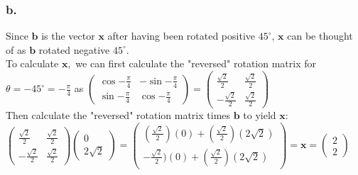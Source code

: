 \documentclass[fleqn]{article}
\begin{document}
\subsubsection*{b.}
Since $\textbf{b}$ is the vector $\textbf{x}$ after having been rotated positive $45^{\circ}$, $\textbf{x}$ can be thought of as $\textbf{b}$ rotated negative $45^{\circ}$.\\
To calculate $\textbf{x},$ we can first calculate the "reversed" rotation matrix for $\theta = -45^{\circ} = -\frac{\pi}{4}$ as $\begin{pmatrix}\cos{-\frac{\pi}{4}} & -\sin{-\frac{\pi}{4}}\\ \sin{-\frac{\pi}{4}} & \cos{-\frac{\pi}{4}}\ \end{pmatrix} = \begin{pmatrix} \frac{\sqrt{2}}{2} & \frac{\sqrt{2}}{2}\\ -\frac{\sqrt{2}}{2} & \frac{\sqrt{2}}{2}
\end{pmatrix}$\\
Then calculate the "reversed" rotation matrix times $\textbf{b}$ to yield $\textbf{x}$:\\
$\begin{pmatrix} \frac{\sqrt{2}}{2} & \frac{\sqrt{2}}{2}\\ -\frac{\sqrt{2}}{2} & \frac{\sqrt{2}}{2}
\end{pmatrix}\begin{pmatrix}0 \\ 2\sqrt{2}\end{pmatrix}=  \begin{pmatrix} (\frac{\sqrt{2}}{2})(0) + (\frac{\sqrt{2}}{2})(2\sqrt{2})\\ -\frac{\sqrt{2}}{2})(0) + (\frac{\sqrt{2}}{2})(2\sqrt{2})
\end{pmatrix}=\textbf{x}=\begin{pmatrix}2\\2\end{pmatrix}$
\pagebreak
\end{document}
